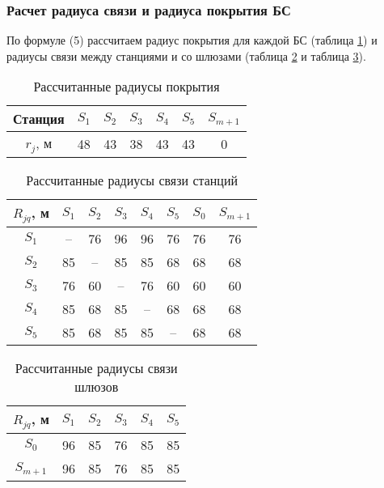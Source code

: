 \subsubsection{Расчет радиуса связи и радиуса покрытия БС}

По формуле (5) рассчитаем радиус покрытия для каждой БС (таблица \cref{tab:part4_sta_coverage}) и радиусы связи между станциями и со шлюзами (таблица \cref{tab:part4_sta_link} и таблица \cref{tab:part4_gateway_link}).

\begin{table}[h!]\centering
  \begin{tabular}{|c||c c c c c c|}\hline
      
      Станция&	$S_1$& $S_2$& $S_3$& $S_4$& $S_5$& $S_{m+1}$\\
      \hline
      $r_j$, м&	48&	43&	38&	43&	43&	0\\
      \hline

\end{tabular}\caption{Рассчитанные радиусы покрытия}\label{tab:part4_sta_coverage}
\end{table}

\begin{table}[h!]\centering
  \begin{tabular}{|c|c c c c c c c|}\hline
      
      $R_{jq}$, м&	$S_1$& $S_2$& $S_3$& $S_4$& $S_5$& $S_0$& $S_{m+1}$\\
      \hline
      $S_1$& --&	76&	96&	96&	76&	76&	76\\
      $S_2$& 85&	--&	85&	85&	68&	68&	68\\
      $S_3$& 76&	60&	--&	76&	60&	60&	60\\
      $S_4$& 85&	68&	85&	--&	68&	68&	68\\
      $S_5$& 85&	68&	85&	85&	--&	68&	68\\

      \hline
\end{tabular}\caption{Рассчитанные радиусы связи станций}\label{tab:part4_sta_link}
\end{table}

\begin{table}[h!]\centering
  \begin{tabular}{|c|c c c c c|}\hline
      
      $R_{jq}$, м&	$S_1$& $S_2$& $S_3$& $S_4$& $S_5$ \\
      \hline
      $S_0$& 96&	85&	76&	85&	85\\
      $S_{m+1}$& 96&	85&	76&	85&	85\\
      \hline
\end{tabular}\caption{Рассчитанные радиусы связи шлюзов}\label{tab:part4_gateway_link}
\end{table}



